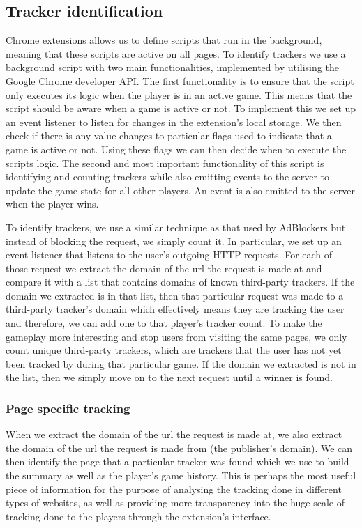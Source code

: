 \documentclass{l4proj}
\begin{document}
\subsection{Tracker identification}
Chrome extensions allows us to define scripts that run in the background, meaning that these scripts are active on all pages. To identify trackers we use a background script with two main functionalities, implemented by utilising the Google Chrome developer API. The first functionality is to ensure that the script only executes its logic when the player is in an active game. This means that the script should be aware when a game is active or not. To implement this we set up an event listener to listen for changes in the extension's local storage. We then check if there is any value changes to particular flags used to indicate that a game is active or not. Using these flags we can then decide when to execute the scripts logic. The second and most important functionality of this script is identifying and counting trackers while also emitting events to the server to update the game state for all other players. An event is also emitted to the server when the player wins. 

To identify trackers, we use a similar technique as that used by AdBlockers but instead of blocking the request, we simply count it. In particular, we set up an event listener that listens to the user's outgoing HTTP requests. For each of those request we extract the domain of the url the request is made at and compare it with a list that contains domains of known third-party trackers. If the domain we extracted is in that list, then that particular request was made to a third-party tracker's domain which effectively means they are tracking the user and therefore, we can add one to that player's tracker count. To make the gameplay more interesting and stop users from visiting the same pages, we only count unique third-party trackers, which are trackers that the user has not yet been tracked by during that particular game. If the domain we extracted is not in the list, then we simply move on to the next request until a winner is found.

\subsubsection{Page specific tracking}
When we extract the domain of the url the request is made at, we also extract the domain of the url the request is made from (the publisher's domain). We can then identify the page that a particular tracker was found which we use to build the summary as well as the player's game history. This is perhaps the most useful piece of information for the purpose of analysing the tracking done in different types of websites, as well as providing more transparency into the huge scale of tracking done to the players through the extension's interface.
\end{document}
